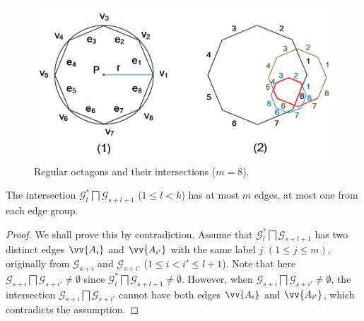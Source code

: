 \begin{figure}[tb!]
\centering
\includegraphics[scale=0.86]{figures/Fig-polygons.png}
\vspace{-1ex}
\caption{\small Regular octagons and their intersections ($m =8$).}
\vspace{-2ex}
\label{fig:polygons}
\end{figure}


\begin{prop}
\label{prop-rp-intersection}
The intersection $\mathcal{G}^*_{l} \bigsqcap \mathcal{G}_{s+l+1}$ ($ 1\le l< k$) has at most $m$ edges, \ie at most one from each edge group.
\end{prop}





\begin{proof}
We shall prove this by contradiction.
Assume that $\mathcal{G}^*_{l} \bigsqcap \mathcal{G}_{s+l+1}$ has two distinct edges $\vv{A_i}$ and $\vv{A_{i'}}$  with the same label $j$ $(1\le j \le m)$, originally from
$\mathcal{G}_{s+i}$ and $\mathcal{G}_{s+i'}$  ($1\le i< i' \le l+1$).
%
Note that here $\mathcal{G}_{s+i} \bigsqcap \mathcal{G}_{s+i'} \ne \emptyset$ since $\mathcal{G}^*_l \bigsqcap \mathcal{G}_{s+l+1} \ne \emptyset$.
%
However, when $\mathcal{G}_{s+i} \bigsqcap \mathcal{G}_{s+i'} \ne \emptyset$, the intersection $\mathcal{G}_{s+i} \bigsqcap \mathcal{G}_{s+i'}$ cannot have
both edges $\vv{A_i}$ and $\vv{A_{i'}}$, which contradicts the assumption.
\end{proof}



